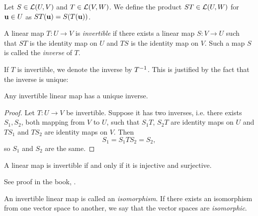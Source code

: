 \documentclass{article}
\begin{document}

\begin{definition}
Let $S \in {\mathcal{L}}(U,V)$ and $T \in {\mathcal{L}}(V,W)$. We define the product $ST \in {\mathcal{L}}(U,W)$ for ${\mathbf{u}}\in U$ as $ST({\mathbf{u}}) = S(T({\mathbf{u}}))$.
\end{definition}

\begin{definition}
A linear map $T: U \to V$ is \emph{invertible} if there exists a linear map $S: V \to U$ such that $ST$ is the identity map on $U$ and $TS$ is the identity map on $V$. Such a map $S$ is called the \emph{inverse} of $T$. 
\end{definition}

If $T$ is invertible, we denote the inverse by $T^{-1}$. This is justified by the fact that the inverse is unique:

\begin{proposition}
Any invertible linear map has a unique inverse.
\end{proposition}
\begin{proof}
Let $T:U \to V$ be invertible. Suppose it has two inverses, i.e. there exists $S_1, S_2$, both mapping from $V$ to $U$, such that $S_1 T$, $S_2 T$ are identity maps on $U$ and $T S_1$ and $T S_2$ are identity maps on $V$. Then
\begin{equation*}
    S_1 = S_1 T S_2 = S_2,
\end{equation*}
so $S_1$ and $S_2$ are the same.
\end{proof}

\begin{theorem}
\label{thm:invertiblesurjectiveinjective}
A linear map is invertible if and only if it is injective and surjective.
\end{theorem}

See proof in the book, \cite[p.81]{linalgright}.

\begin{definition}
An invertible linear map is called an \emph{isomorphism}. If there exists an isomorphism from one vector space to another, we say that the vector spaces are \emph{isomorphic}.
\end{definition}
\end{document}
